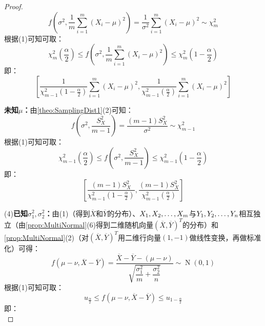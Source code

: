 \begin{proof}
	\begin{equation*}
		f\left(\sigma^2,\frac{1}{m}\sum_{i=1}^{m}(X_i-\mu)^2\right)=\frac{1}{\sigma^2}\sum_{i=1}^{m}(X_i-\mu)^2\sim\chi_{m}^2
	\end{equation*}
	根据(1)可知可取：
	\begin{equation*}
		\chi_{m}^2\left(\frac{\alpha}{2}\right)\leqslant f\left(\sigma^2,\frac{1}{m}\sum_{i=1}^{m}(X_i-\mu)^2\right)\leqslant\chi_{m}^2\left(1-\frac{\alpha}{2}\right)
	\end{equation*}
	即：
	\begin{equation*}
		\left[\frac{1}{\chi_{m-1}^2\left(1-\frac{\alpha}{2}\right)}\sum_{i=1}^{m}(X_i-\mu)^2,\frac{1}{\chi_{m-1}^2\left(\frac{\alpha}{2}\right)}\sum_{i=1}^{m}(X_i-\mu)^2\right]
	\end{equation*}\par
	\textbf{未知$\mu$：}由\cref{theo:SamplingDist1}(2)可知：
	\begin{equation*}
		f\left(\sigma^2,\frac{S_X^2}{m-1}\right)=\frac{(m-1)S_X^2}{\sigma^2}\sim\chi_{m-1}^2
	\end{equation*}
	根据(1)可知可取：
	\begin{equation*}
		\chi_{m-1}^2\left(\frac{\alpha}{2}\right)\leqslant f\left(\sigma^2,\frac{S_X^2}{m-1}\right)\leqslant\chi_{m-1}^2\left(1-\frac{\alpha}{2}\right)
	\end{equation*}
	即：
	\begin{equation*}
		\left[\frac{(m-1)S_X^2}{\chi_{m-1}^2\left(1-\frac{\alpha}{2}\right)},\frac{(m-1)S_X^2}{\chi_{m-1}^2\left(\frac{\alpha}{2}\right)}\right]
	\end{equation*}\par
	(4)\textbf{已知$\sigma_1^2,\sigma_2^2$：}由(1)（得到$\overline{X}$和$\overline{Y}$的分布）、$X_1, X_2, \dots, X_{m}$与$Y_1, Y_2, \dots, Y_{n}$相互独立（由\cref{prop:MultiNormal}(6)得到二维随机向量$(\overline{X},\overline{Y})^T$的分布）和\cref{prop:MultiNormal}(2)（对$(\overline{X},\overline{Y})^T$用二维行向量$(1,-1)$做线性变换，再做标准化）可得：
	\begin{equation*}
		f(\mu-\nu,\overline{X}-\overline{Y})=\frac{\overline{X}-\overline{Y}-(\mu-\nu)}{\sqrt{\dfrac{\sigma_1^2}{m}+\dfrac{\sigma_2^2}{n}}}\sim\operatorname{N}\left(0,1\right)
	\end{equation*}
	根据(1)可知可取：
	\begin{equation*}
		u_{\frac{\alpha}{2}}\leqslant f(\mu-\nu,\overline{X}-\overline{Y})\leqslant u_{1-\frac{\alpha}{2}}
	\end{equation*}
	即：
	\begin{equation*}

\end{equation*}
\end{proof}
